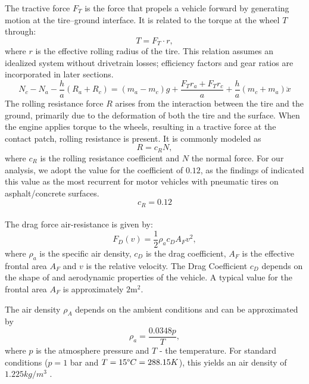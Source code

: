 The tractive force $F_T$ is the force that propels a vehicle forward by generating motion at the tire–ground interface. It is related to the torque at the wheel $T$ through:
\begin{equation*}
	T = F_T\cdot r,
\end{equation*}
where $r$ is the effective rolling radius of the tire. This relation assumes an idealized system without drivetrain losses; efficiency factors and gear ratios are incorporated in later sections.
\begin{equation} \label{eq: M_bf3}
	N_c - N_a -\frac{h}{a}(R_a+R_c) = (m_a - m_c)g + \frac{F_Tr_a+F_Tr_c}{a} + \frac{h}{a}(m_c+m_a)\ddot x
\end{equation}
The rolling resistance force $R$ arises from the interaction between the tire and the ground, primarily due to the deformation of both the tire and the surface. When the engine applies torque to the wheels, resulting in a tractive force at the contact patch, rolling resistance is present. It is commonly modeled as
\begin{equation*}
	R = c_R N,
\end{equation*}
where $c_R$ is the rolling resistance coefficient and $N$ the normal force. For our analysis, we adopt the value for the coefficient of $0.12$, as the findings of \parencite{wargula2019determination} indicated this value as the most recurrent for motor vehicles with pneumatic tires on asphalt/concrete surfaces.
\begin{equation*}
	c_R = 0.12
\end{equation*}
\\
The drag force air-resistance is given by: 
\begin{equation*}
	F_D(v) = \frac{1}{2}\rho_a c_D A_F v^2,
\end{equation*}
where $\rho_a$ is the specific air density, $c_D$ is the drag coefficient, $A_F$ is the effective frontal area $A_F$ and $v$ is the relative velocity. The Drag Coefficient $c_D$ depends on the shape of and aerodynamic properties of the vehicle. A typical value for the frontal area $A_F$ is approximately $2\text{m}^2$.
	
The air density $\rho_A$ depends on the ambient conditions and can be approximated by 
\begin{equation*}
	\rho_a = \frac{0.0348p}{T},
\end{equation*}
where $p$ is the atmosphere pressure and $T$ - the temperature. For standard conditions ($p= 1$ bar and $T= 15\degree C=288.15K$), this yields an air density of $1.225kg/m^3$ \parencite[p. 135]{mashadi2012vehicle}. 
	
